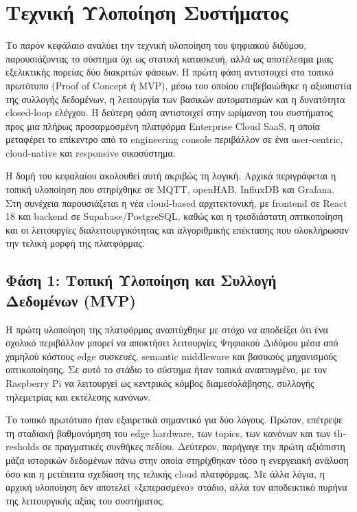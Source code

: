 ﻿\chapter{Τεχνική Υλοποίηση Συστήματος}
Το παρόν κεφάλαιο αναλύει την τεχνική υλοποίηση του ψηφιακού διδύμου, παρουσιάζοντας το σύστημα όχι ως στατική κατασκευή, αλλά ως αποτέλεσμα μιας εξελικτικής πορείας δύο διακριτών φάσεων. Η πρώτη φάση αντιστοιχεί στο τοπικό πρωτότυπο (\textlatin{Proof of Concept} ή \textlatin{MVP}), μέσω του οποίου επιβεβαιώθηκε η αξιοπιστία της συλλογής δεδομένων, η λειτουργία των βασικών αυτοματισμών και η δυνατότητα \textlatin{closed-loop} ελέγχου. Η δεύτερη φάση αντιστοιχεί στην ωρίμανση του συστήματος προς μια πλήρως προσαρμοσμένη πλατφόρμα \textlatin{Enterprise Cloud SaaS}, η οποία μεταφέρει το επίκεντρο από το \textlatin{engineering console} περιβάλλον σε ένα \textlatin{user-centric}, \textlatin{cloud-native} και \textlatin{responsive} οικοσύστημα.

Η δομή του κεφαλαίου ακολουθεί αυτή ακριβώς τη λογική. Αρχικά περιγράφεται η τοπική υλοποίηση που στηρίχθηκε σε \textlatin{MQTT}, \textlatin{openHAB}, \textlatin{InfluxDB} και \textlatin{Grafana}. Στη συνέχεια παρουσιάζεται η νέα \textlatin{cloud-based} αρχιτεκτονική, με \textlatin{frontend} σε \textlatin{React 18} και \textlatin{backend} σε \textlatin{Supabase/PostgreSQL}, καθώς και η τρισδιάστατη οπτικοποίηση και οι λειτουργίες διαλειτουργικότητας και αλγοριθμικής επέκτασης που ολοκλήρωσαν την τελική μορφή της πλατφόρμας.

\section{Φάση 1: Τοπική Υλοποίηση και Συλλογή Δεδομένων (MVP)}
Η πρώτη υλοποίηση της πλατφόρμας αναπτύχθηκε με στόχο να αποδείξει ότι ένα σχολικό περιβάλλον μπορεί να αποκτήσει λειτουργίες Ψηφιακού Διδύμου μέσα από χαμηλού κόστους \textlatin{edge} συσκευές, \textlatin{semantic middleware} και βασικούς μηχανισμούς οπτικοποίησης. Σε αυτό το στάδιο το σύστημα ήταν τοπικά αναπτυγμένο, με τον \textlatin{Raspberry Pi} να λειτουργεί ως κεντρικός κόμβος διαμεσολάβησης, συλλογής τηλεμετρίας και εκτέλεσης κανόνων.

Το τοπικό πρωτότυπο ήταν εξαιρετικά σημαντικό για δύο λόγους. Πρώτον, επέτρεψε τη σταδιακή βαθμονόμηση του \textlatin{edge hardware}, των \textlatin{topics}, των κανόνων και των \textlatin{thresholds} σε πραγματικές συνθήκες πεδίου. Δεύτερον, παρήγαγε την πρώτη αξιόπιστη μάζα ιστορικών δεδομένων πάνω στην οποία στηρίχθηκαν τόσο η ενεργειακή ανάλυση όσο και η μετέπειτα σχεδίαση της τελικής \textlatin{cloud} πλατφόρμας. Με άλλα λόγια, η αρχική υλοποίηση δεν αποτελεί «ξεπερασμένο» στάδιο, αλλά τον αποδεικτικό πυρήνα της λειτουργικής αξίας του συστήματος.

